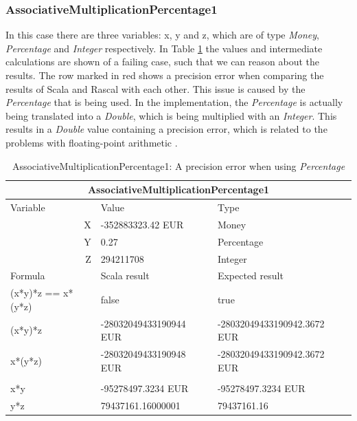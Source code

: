 \subsubsection{AssociativeMultiplicationPercentage1}
In this case there are three variables: x, y and z, which are of type \textit{Money}, \textit{Percentage} and \textit{Integer} respectively. In Table \ref{ch4_init_check_AssociativeMultiplicationPercentage1} the values and intermediate calculations are shown of a failing case, such that we can reason about the results. The row marked in red shows a precision error when comparing the results of Scala and Rascal with each other. This issue is caused by the \textit{Percentage} that is being used. In the implementation, the \textit{Percentage} is actually being translated into a \textit{Double}, which is being multiplied with an \textit{Integer}. This results in a \textit{Double} value containing a precision error, which is related to the problems with floating-point arithmetic \cite{goldberg1991every}.
\\
\begin{table}[h!]
\centering
\begin{tabular}{|lll|}
\hline
\multicolumn{3}{|c|}{AssociativeMultiplicationPercentage1}                    \\ \hline
Variable               & Value                  & Type                        \\
\multicolumn{1}{|r}{X} & -352883323.42 EUR      & Money                       \\
\multicolumn{1}{|r}{Y} & 0.27                   & Percentage                  \\
\multicolumn{1}{|r}{Z} & 294211708              & Integer                     \\ \hline
Formula                & Scala result           & Expected result             \\
(x*y)*z == x*(y*z)     & false                  & true                        \\
(x*y)*z                & -28032049433190944 EUR & -28032049433190942.3672 EUR \\
x*(y*z)                & -28032049433190948 EUR & -28032049433190942.3672 EUR \\
                       &                        &                             \\
x*y                    & -95278497.3234 EUR     & -95278497.3234 EUR          \\
y*z                    & 79437161.16000001      & 79437161.16                 \\ \hline
\end{tabular}
\caption{AssociativeMultiplicationPercentage1: A precision error when using \textit{Percentage}}
\label{ch4_init_check_AssociativeMultiplicationPercentage1}
\end{table}
